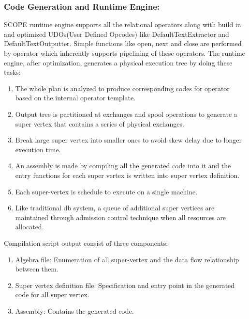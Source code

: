 \documentclass[runningheads,a4paper]{llncs}
\begin{document}
{\subsubsection{Code Generation and Runtime Engine: }
SCOPE runtime engine supports all the relational operators along with build in and optimized UDOs(User Defined Opcodes) like DefaultTextExtractor and DefaultTextOutputter. Simple functions like open, next and close are performed by operator which inherently supports pipelining of these operators.  The runtime engine, after optimization, generates a physical execution tree by doing these tasks:
\begin{enumerate}
	\item The whole plan is analyzed to produce corresponding codes for operator based on the internal operator template.
	\item  Output tree is partitioned at exchanges and spool operations to generate a super vertex that contains a series of physical exchanges.
	\item Break large super vertex into smaller ones to avoid skew delay due to longer execution time.
	\item An assembly is made by compiling all the generated code into it and the entry functions for each super vertex is written into super vertex definition.
	\item Each super-vertex is schedule to execute on a single machine.
	\item Like traditional db system, a queue of additional super vertices are maintained through admission control technique when all resources are allocated.
\end{enumerate}

Compilation script output consist of three components:
\begin{enumerate}
	\item Algebra file: Enumeration of all super-vertex and the data flow relationship between them.
	\item Super vertex definition file: Specification and entry point in the generated code for all super vertex.
	\item Assembly: Contains the generated code.
\end{enumerate}

}
\end{document}
